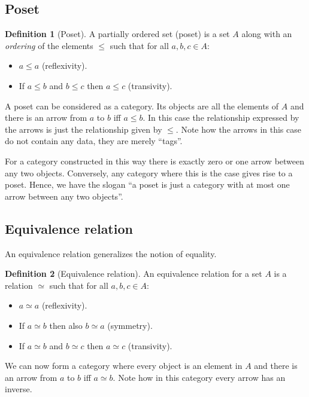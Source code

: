 \documentclass{book}
\theoremstyle{definition}
\newtheorem{definition}{Definition}[section]
\begin{document}
\subsection{Poset}

\begin{definition}[Poset]
  A partially ordered set (poset) is a set $A$ along with an \emph{ordering} of the elements $\leq$ such that for all $a, b, c \in A$:
  \begin{itemize}
    \item $a \leq a$ (reflexivity).
    \item If $a \leq b$ and $b \leq c$ then $a \leq c$ (transivity).
  \end{itemize}
\end{definition}

A poset can be considered as a category.
Its objects are all the elements of $A$ and there is an arrow from $a$ to $b$ iff $a \leq b$.
In this case the relationship expressed by the arrows is just the relationship given by $\leq$.
Note how the arrows in this case do not contain any data, they are merely ``tags''.


For a category constructed in this way there is exactly zero or one arrow between any two objects.
Conversely, any category where this is the case gives rise to a poset.
Hence, we have the slogan ``a poset is just a category with at most one arrow between any two objects''.

\subsection{Equivalence relation}

An equivalence relation generalizes the notion of equality.

\begin{definition}[Equivalence relation]
  An equivalence relation for a set $A$ is a relation $\simeq$ such that for all $a, b, c \in A$:
  \begin{itemize}
    \item $a \simeq a$ (reflexivity).
    \item If $a \simeq b$ then also $b \simeq a$ (symmetry).
    \item If $a \simeq b$ and $b \simeq c$ then $a \simeq c$ (transivity).
  \end{itemize}
\end{definition}

We can now form a category where every object is an element in $A$ and there is an arrow from $a$ to $b$ iff $a \simeq b$.
Note how in this category every arrow has an inverse.
\end{document}
